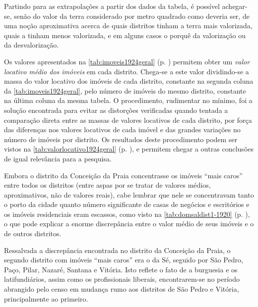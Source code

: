Partindo para as extrapolações a partir dos dados da tabela, é possível achegar-se, senão do valor da terra considerado por metro quadrado como deveria ser, de uma noção aproximativa acerca de quais distritos tinham a terra mais valorizada, quais a tinham menos valorizada, e em alguns casos o porquê da valorização ou da desvalorização.

Os valores apresentados na \autoref{tab:imoveis1924geral} (p. \pageref{tab:imoveis1924geral}) permitem obter um \textit{valor locativo médio dos imóveis} em cada distrito. Chega-se a este valor dividindo-se a massa do valor locativo dos imóveis de cada distrito, constante na segunda coluna da \autoref{tab:imoveis1924geral}, pelo número de imóveis do mesmo distrito, constante na última coluna da mesma tabela. O procedimento, rudimentar no mínimo, foi a solução encontrada para evitar as distorções verificadas quando tentada a comparação direta entre as massas de valores locativos de cada distrito, por força das diferenças nos valores locativos de cada imóvel e das grandes variações no número de imóveis por distrito. Os resultados deste procedimento podem ser vistos na \autoref{tab:valorlocativo1924geral} (p. \pageref{tab:valorlocativo1924geral}), e permitem chegar a outras conclusões de igual relevância para a pesquisa.



Embora o distrito da Conceição da Praia concentrasse os imóveis ``mais caros'' entre todos os distritos (entre aspas por se tratar de valores médios, aproximativos, não de valores reais), cabe lembrar que nele se concentravam tanto o porto da cidade quanto número significante de casas de negócios e escritórios e os imóveis residenciais eram escassos, como visto na \autoref{tab:domsaldist1-1920} (p. \pageref{tab:domsaldist1-1920}), o que pode explicar a enorme discrepância entre o valor médio de seus imóveis e o de outros distritos.

Ressalvada a discrepância encontrada no distrito da Conceição da Praia, o segundo distrito com imóveis ``mais caros'' era o da Sé, seguido por São Pedro, Paço, Pilar, Nazaré, Santana e Vitória. Isto reflete o fato de a burguesia e os latifundiários, assim como os profissionais liberais, encontrarem-se no período abrangido pelo censo em mudança rumo aos distritos de São Pedro e Vitória, principalmente ao primeiro.

